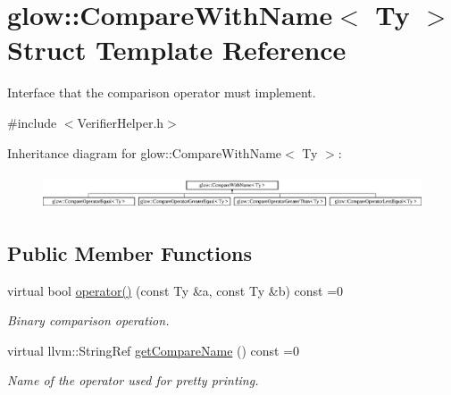 \hypertarget{structglow_1_1_compare_with_name}{}\section{glow\+:\+:Compare\+With\+Name$<$ Ty $>$ Struct Template Reference}
\label{structglow_1_1_compare_with_name}


Interface that the comparison operator must implement.  




{\ttfamily \#include $<$Verifier\+Helper.\+h$>$}

Inheritance diagram for glow\+:\+:Compare\+With\+Name$<$ Ty $>$\+:\begin{figure}[H]
\begin{center}
\leavevmode
\includegraphics[height=1.052632cm]{structglow_1_1_compare_with_name}
\end{center}
\end{figure}
\subsection*{Public Member Functions}
\begin{DoxyCompactItemize}
\item 
\mbox{\label{structglow_1_1_compare_with_name_a4e59bedfe02be5b5fcfdf1064b6029d7}} 
virtual bool \hyperlink{structglow_1_1_compare_with_name_a4e59bedfe02be5b5fcfdf1064b6029d7}{operator()} (const Ty \&a, const Ty \&b) const =0
\begin{DoxyCompactList}\small\item\em Binary comparison operation. \end{DoxyCompactList}\item 
\mbox{\label{structglow_1_1_compare_with_name_ad058672dd90e416c77c9397ed261703b}} 
virtual llvm\+::\+String\+Ref \hyperlink{structglow_1_1_compare_with_name_ad058672dd90e416c77c9397ed261703b}{get\+Compare\+Name} () const =0
\begin{DoxyCompactList}\small\item\em Name of the operator used for pretty printing. \end{DoxyCompactList}\end{DoxyCompactItemize}


